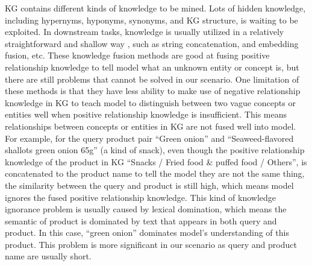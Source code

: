 KG contains different kinds of knowledge to be mined. Lots of hidden knowledge, including hypernyms, hyponyms, synonyms, and KG structure, is waiting to be exploited. In downstream tasks, knowledge is usually utilized in a relatively straightforward and shallow way \cite{bian2021benchmarking, luo2020alicoco, luo2021alicoco2, zhang2021enriching}, such as string concatenation, and embedding fusion, etc. These knowledge fusion methods are good at fusing positive relationship knowledge to tell model what an unknown entity or concept is, but there are still problems that cannot be solved in our scenario. One limitation of these methods is that they have less ability to make use of negative relationship knowledge in KG to teach model to distinguish between two vague concepts or entities well when positive relationship knowledge is insufficient. This means relationships between concepts or entities in KG are not fused well into model. For example, for the query product pair ``Green onion'' and ``Seaweed-flavored shallots green onion 65g'' (a kind of snack), even though the positive relationship knowledge of the product in KG ``Snacks / Fried food \& puffed food / Others'', is concatenated to the product name to tell the model they are not the same thing, the similarity between the query and product is still high, which means model ignores the fused positive relationship knowledge. This kind of knowledge ignorance problem is usually caused by lexical domination, which means the semantic of product is dominated by text that appears in both query and product. In this case, ``green onion'' dominates model's understanding of this product. This problem is more significant in our scenario as query and product name are usually short.










